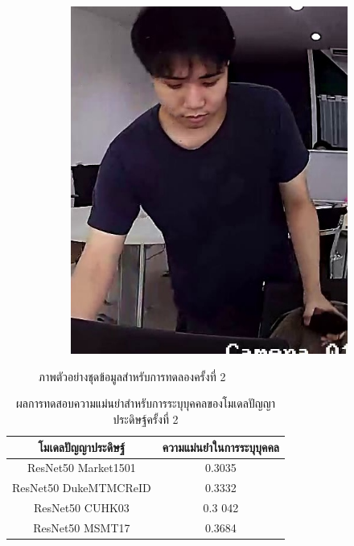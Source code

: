 \begin{figure}[!ht]
\begin{subfigure}[b]{0.2\textwidth}
        \includegraphics[width=\textwidth]{chapter4/images/first_1.jpg}
        \label{fig:ex_4}
    \end{subfigure}
    \caption{ภาพตัวอย่างชุดข้อมูลสำหรับการทดลองครั้งที่ 2}
    \label{fig: ภาพตัวอย่างชุดข้อมูลสำหรับการทดลอง 2}
\end{figure}
\begin{table}[!ht]
\centering
\begin{tabular}{|c|c|}
		\hline
		{โมเดลปัญญาประดิษฐ์}&{ความแม่นยำในการระบุบุคคล}							\\
		\hline
		ResNet50 Market1501	 			& 0.3035								\\
		ResNet50 DukeMTMCReID			& 0.3332								\\
		ResNet50 CUHK03				& 0.3	042								\\
		ResNet50 MSMT17				& 0.3684								\\
	\hline
\end{tabular}
\caption{ผลการทดสอบความแม่นยำสำหรับการระบุบุคคลของโมเดลปัญญาประดิษฐ์ครั้งที่ 2}
\label{tab: Original distant of image 2}
\end{table}
